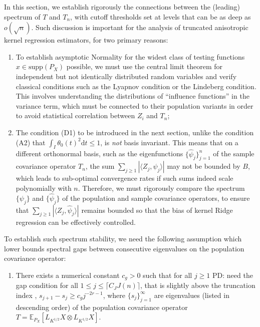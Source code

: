 \documentclass[11pt,a4paper]{article}
\renewcommand{\hat}{\widehat}
\theoremstyle{definition}
\theoremstyle{plain}
\theoremstyle{remark}
\newcommand{\supp}{\mathrm{supp}}
\newcommand{\ud}{\mathrm d}
\newcommand{\pd}[1]{
	{ \color{blue} PD: #1}
}
\begin{document}
In this section, we establish rigorously the connections between the (leading) spectrum of $T$ and $T_n$,
with cutoff thresholds set at levels that can be as deep as $o(\sqrt{n})$. Such discussion is important for the analysis of truncated anisotropic kernel regression estimators, for two primary reasons:
\begin{enumerate}
\item To establish asymptotic Normality for the widest class of testing functions $x\in\supp(P_X)$ possible, we must use the central limit theorem for independent but not identically distributed random variables
and verify classical conditions such as the Lyapnov condition or the Lindeberg condition. This involves understanding the distributions of ``influence functions'' in the variance term, which must be connected to
their population variants in order to avoid statistical correlation between $Z_i$ and $T_n$;
\item The condition (D1) to be introduced in the next section, unlike the condition (A2) that $\int_I \theta_0(t)^2\ud t\leq 1$, is \emph{not} basis invariant. This means that on a different orthonormal basis,
such as the eigenfunctions $\{\hat\psi_j\}_{j=1}^n$ of the sample covariance operator $T_n$, the sum $\sum_{j\geq 1}|\langle Z_j,\hat\psi_j\rangle|$ may not be bounded by $B$,
which leads to sub-optimal convergence rates if such sums indeed scale polynomially with $n$.
Therefore, we must rigorously compare the spectrum $\{\psi_j\}$ and $\{\hat\psi_j\}$ of the population and sample covariance operators,
to ensure that $\sum_{j\geq 1}|\langle Z_j,\hat\psi_j\rangle|$ remains bounded so that the bias of kernel Ridge regression can be effectively controlled.
\end{enumerate}

To establish such spectrum stability, we need the following assumption which lower bounds spectral gaps between consecutive eigenvalues on the population covariance operator:
\begin{enumerate}
\item[(C1)] There exists a numerical constant $c_g>0$ such that for all $j\geq 1$ \pd{need the gap condition for all $1 \leq j \leq \lceil C_J J(n) \rceil$, that is slightly above the truncation index}, $s_{j+1}-s_j\geq c_g j^{-2r-1}$, where $\{s_j\}_{j=1}^{\infty}$ are eigenvalues (listed in descending order) of the population covariance operator $T=\mathbb E_{P_X}[L_{K^{1/2}}X\otimes L_{K^{1/2}}X]$.
\end{enumerate}
\end{document}
